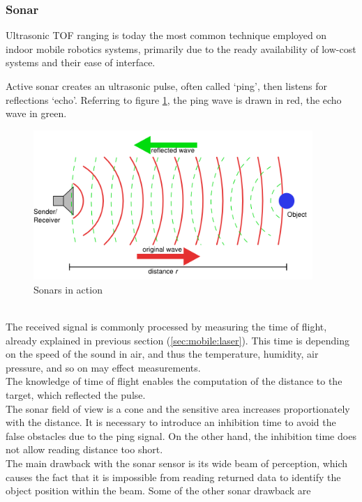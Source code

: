 \subsubsection{Sonar}
\label{sec:mobile:sonar}

Ultrasonic TOF ranging is today the most common technique employed
on indoor mobile robotics systems, primarily due to the ready
availability of low-cost systems and their ease of interface.

Active sonar creates an ultrasonic pulse, often called `ping',
then listens for reflections `echo'. Referring to figure
\ref{fig:sonar}, the ping wave is drawn in red, the echo wave
in green.
\begin{figure} [h]
  \begin{center}
    \includegraphics[width=300pt]{img/sonar.png}
    \caption{Sonars in action}
    \label{fig:sonar}
  \end{center}
\end{figure}
\\
The received signal is commonly processed by measuring the time of flight,
already explained in previous section (\ref{sec:mobile:laser}).
This time is depending on the speed of the sound in air, and thus the
temperature, humidity, air pressure, and so on may effect measurements.
\\
The knowledge of time of flight enables the computation of the distance
to the target, which reflected the pulse.
\\
The sonar field of view is a cone and the sensitive area increases
proportionately with the distance. It is necessary to introduce an
inhibition time to avoid the false obstacles due to the ping signal.
On the other hand, the inhibition time does not allow reading
distance too short.
\\
The main drawback with the sonar sensor is its wide beam of perception, which
causes the fact that it is impossible from reading returned data to identify
the object position within the beam. Some of the other sonar drawback are
